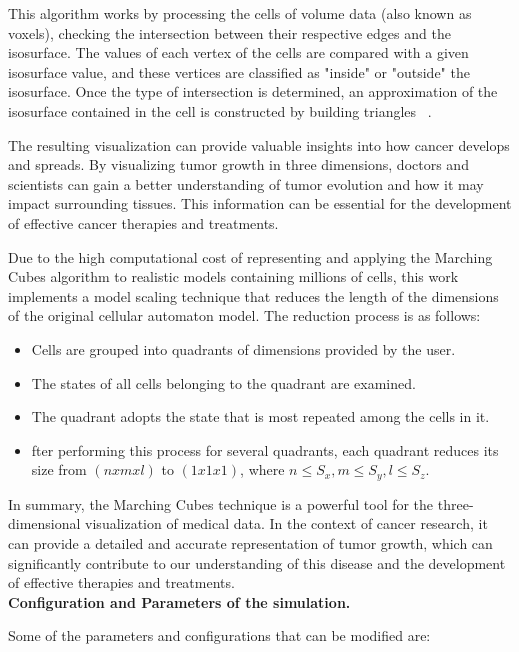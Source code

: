 \documentclass[a4paper,11pt]{article}
\begin{document}
{This algorithm works by processing the cells of volume data (also known as voxels), checking the intersection between their respective edges and the isosurface. The values of each vertex of the cells are compared with a given isosurface value, and these vertices are classified as "inside" or "outside" the isosurface. Once the type of intersection is determined, an approximation of the isosurface contained in the cell is constructed by building triangles ~\cite{1}.

The resulting visualization can provide valuable insights into how cancer develops and spreads. By visualizing tumor growth in three dimensions, doctors and scientists can gain a better understanding of tumor evolution and how it may impact surrounding tissues. This information can be essential for the development of effective cancer therapies and treatments.

Due to the high computational cost of representing and applying the Marching Cubes algorithm to realistic models containing millions of cells, this work implements a model scaling technique that reduces the length of the dimensions of the original cellular automaton model. The reduction process is as follows:
\begin{itemize}
    \item Cells are grouped into quadrants of dimensions provided by the user.
    \item The states of all cells belonging to the quadrant are examined.
    \item The quadrant adopts the state that is most repeated among the cells in it.
    \item fter performing this process for several quadrants, each quadrant reduces its size from $(n x m x l)$ to $(1 x 1 x 1)$, where $n \leq S_{x} ,m \leq S_{y},l \leq S_{z}$. 
\end{itemize}

In summary, the Marching Cubes technique is a powerful tool for the three-dimensional visualization of medical data. In the context of cancer research, it can provide a detailed and accurate representation of tumor growth, which can significantly contribute to our understanding of this disease and the development of effective therapies and treatments.\\

\textbf{Configuration and Parameters of the simulation.}

Some of the parameters and configurations that can be modified are:
}
\end{document}
